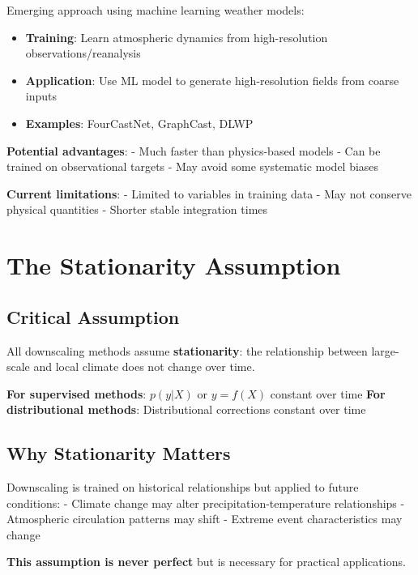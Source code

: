 \documentclass[
  letterpaper,
  DIV=11,
  numbers=noendperiod]{scrreprt}
\providecommand{\tightlist}{%
  \setlength{\itemsep}{0pt}\setlength{\parskip}{0pt}}
\begin{document}
Emerging approach using machine learning weather models:

\begin{itemize}
\tightlist
\item
  \textbf{Training}: Learn atmospheric dynamics from high-resolution
  observations/reanalysis
\item
  \textbf{Application}: Use ML model to generate high-resolution fields
  from coarse inputs
\item
  \textbf{Examples}: FourCastNet, GraphCast, DLWP
\end{itemize}

\textbf{Potential advantages}: - Much faster than physics-based models -
Can be trained on observational targets - May avoid some systematic
model biases

\textbf{Current limitations}: - Limited to variables in training data -
May not conserve physical quantities - Shorter stable integration times

\section{The Stationarity Assumption}\label{the-stationarity-assumption}

\subsection{Critical Assumption}\label{critical-assumption}

All downscaling methods assume \textbf{stationarity}: the relationship
between large-scale and local climate does not change over time.

\textbf{For supervised methods}: \(p(y|X)\) or \(y = f(X)\) constant
over time \textbf{For distributional methods}: Distributional
corrections constant over time

\subsection{Why Stationarity Matters}\label{why-stationarity-matters}

Downscaling is trained on historical relationships but applied to future
conditions: - Climate change may alter precipitation-temperature
relationships - Atmospheric circulation patterns may shift - Extreme
event characteristics may change

\textbf{This assumption is never perfect} but is necessary for practical
applications.
\end{document}
